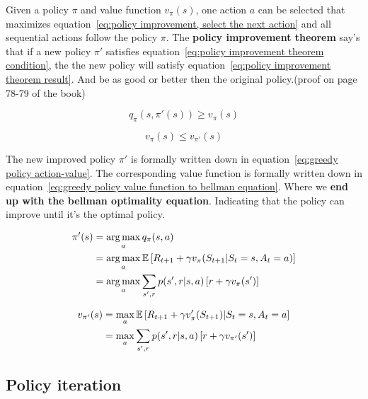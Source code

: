 Given a policy $\pi$ and value function $v_\pi(s)$, one action $a$ can be selected that maximizes equation~\ref{eq:policy improvement, select the next action} and all sequential actions follow the policy $\pi$. The \textbf{policy improvement theorem}  say's that if a new policy $\pi'$ satisfies equation~\ref{eq:policy improvement theorem condition}, the the new policy will satisfy equation~\ref{eq:policy improvement theorem result}. And be as good or better then the original policy.(proof on page 78-79 of the book)

\begin{equation}
q_\pi(s, \pi'(s)) \geq v_\pi(s)
\label{eq:policy improvement theorem condition}
\end{equation}

\begin{equation}
v_{\pi}(s) \leq v_{\pi'}(s)
\label{eq:policy improvement theorem result}
\end{equation}

The new improved policy $\pi'$ is formally written down in equation~\ref{eq:greedy policy action-value}. The corresponding value function is formally written down in equation~\ref{eq:greedy policy value function to bellman equation}. Where we \textbf{end up with the bellman optimality equation}. Indicating that the policy can improve until it's the optimal policy.

\begin{equation}
\begin{split}
\pi'(s) & = \operatorname*{arg\,max}_a q_\pi (s, a) \\
& = \operatorname*{arg\,max}_a \operatorname{\mathbb{E}}\left[ R_{t+1} + \gamma v_\pi(S_{t+1} | S_t = s, A_t = a) \right] \\
& = \operatorname*{arg\,max}_a \sum_{s',r} p(s', r|s, a)\left[r + \gamma v_{\pi}(s')\right]
\end{split}
\label{eq:greedy policy action-value}
\end{equation}

\begin{equation}
\begin{split}
v_{\pi'}(s) 
& = \max_a \operatorname{\mathbb{E}}\left[ R_{t+1} + \gamma v_\pi'(S_{t+1}) | S_t = s, A_t=a \right] \\
& = \max_a \sum_{s', r}p(s', r|s, a)\left[r + \gamma v_{\pi'}(s')\right]
\end{split}
\label{eq:greedy policy value function to bellman equation}
\end{equation}

\subsection{Policy iteration}

